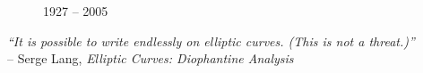 {\begin{frame}[plain]
\begin{minipage}{0.18\textwidth}
\begin{figure}[h]
	{\small 1927 -- 2005}
	\end{figure}
	\end{minipage} \hspace{0.2cm} \begin{minipage}{0.76\textwidth}
	\begin{center} \phantom{.} \par \phantom{.} \par
	{\itshape ``It is possible to write endlessly on elliptic curves. (This is not a threat.)''} \\
	 \phantom{x}\hfill-- Serge Lang, \textit{Elliptic Curves: Diophantine Analysis}
	\end{center}
 	\end{minipage}
\end{frame}
}



\begin{frame}[plain]
\end{frame}



